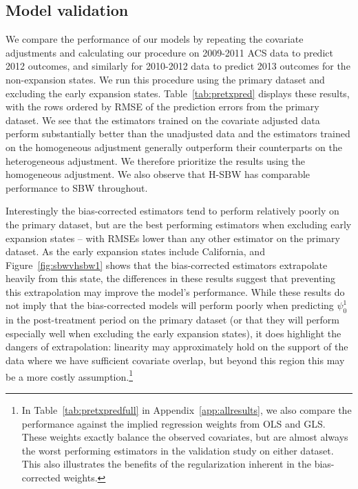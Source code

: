 \documentclass[aoas]{imsart}
\theoremstyle{plain}
\theoremstyle{remark}
\begin{document}
\subsection{Model validation}\label{sec:validation}

We compare the performance of our models by repeating the covariate adjustments and calculating our procedure on 2009-2011 ACS data to predict 2012 outcomes, and similarly for 2010-2012 data to predict 2013 outcomes for the non-expansion states. We run this procedure using the primary dataset and excluding the early expansion states. Table~\ref{tab:pretxpred} displays these results, with the rows ordered by RMSE of the prediction errors from the primary dataset. We see that the estimators trained on the covariate adjusted data perform substantially better than the unadjusted data and the estimators trained on the homogeneous adjustment generally outperform their counterparts on the heterogeneous adjustment. We therefore prioritize the results using the homogeneous adjustment. We also observe that H-SBW has comparable performance to SBW throughout.

Interestingly the bias-corrected estimators tend to perform relatively poorly on the primary dataset, but are the best performing estimators when excluding early expansion states -- with RMSEs lower than any other estimator on the primary dataset. As the early expansion states include California, and Figure~\ref{fig:sbwvhsbw1} shows that the bias-corrected estimators extrapolate heavily from this state, the differences in these results suggest that preventing this extrapolation may improve the model's performance. While these results do not imply that the bias-corrected models will perform poorly when predicting $\psi^1_0$ in the post-treatment period on the primary dataset (or that they will perform especially well when excluding the early expansion states), it does highlight the dangers of extrapolation: linearity may approximately hold on the support of the data where we have sufficient covariate overlap, but beyond this region this may be a more costly assumption.\footnote{In Table~\ref{tab:pretxpredfull} in Appendix~\ref{app:allresults}, we also compare the performance against the implied regression weights from OLS and GLS. These weights exactly balance the observed covariates, but are almost always the worst performing estimators in the validation study on either dataset. This also illustrates the benefits of the regularization inherent in the bias-corrected weights.}
\end{document}
